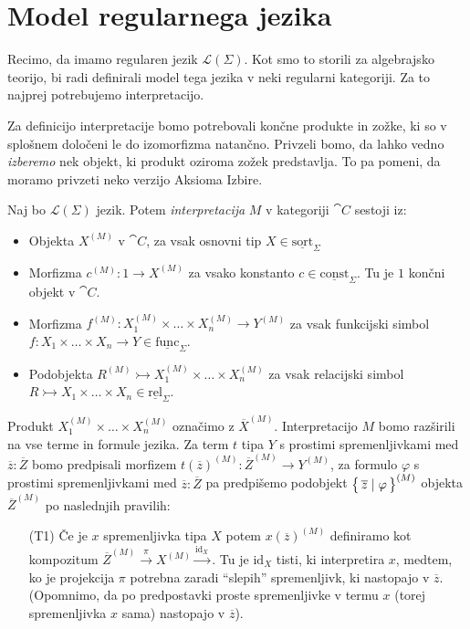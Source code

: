 \documentclass[../kategoricna_logika.tex]{subfiles}
\begin{document}
\section{Model regularnega jezika}
Recimo, da imamo regularen jezik $\mathcal{L}(\Sigma)$. Kot smo to storili za algebrajsko teorijo, bi radi definirali model tega jezika v neki regularni kategoriji.
Za to najprej potrebujemo interpretacijo.
\begin{opomba}
  Za definicijo interpretacije bomo potrebovali končne produkte in zožke, ki so v splošnem določeni le do izomorfizma natančno. Privzeli bomo, da lahko vedno \emph{izberemo} nek objekt, ki produkt oziroma zožek predstavlja. To pa pomeni, da moramo privzeti neko verzijo Aksioma Izbire.
\end{opomba}
\begin{definicija}
  Naj bo $\mathcal{L}(\Sigma)$ jezik. Potem \emph{interpretacija} $M$ v kategoriji $\cat{C}$ sestoji iz:
  \begin{itemize}
    \item Objekta $X^{(M)}$ v $\cat{C}$, za vsak osnovni tip $X \in \underline{\mathrm{sort}}_\Sigma$
    \item Morfizma $c^{(M)} : 1 \to X^{(M)}$ za vsako konstanto $c \in \underline{\mathrm{const}}_\Sigma$. Tu je $1$ končni objekt v $\cat{C}$.
    \item Morfizma $f^{(M)}  : X_1^{(M)} \times \ldots \times X_n^{(M)} \to Y^{(M)}$ za vsak funkcijski simbol $f : X_1 \times \ldots \times X_n \to Y \in \underline{\mathrm{func}}_\Sigma$.
    \item Podobjekta $R^{(M)} \rightarrowtail X_1^{(M)} \times \ldots \times X_n^{(M)}$ za vsak relacijski simbol\\ $R \rightarrowtail X_1 \times \ldots \times X_n \in \underline{\mathrm{rel}}_\Sigma$.
  \end{itemize}
  Produkt $X_1^{(M)} \times \ldots \times X_n^{(M)}$ označimo z $\overline{X}^{(M)}$. 
  Interpretacijo $M$ bomo razširili na vse terme in formule jezika.
  Za term $t$ tipa $Y$ s prostimi spremenljivkami med $\overline{z} : \overline{Z}$ bomo predpisali morfizem $t(\overline{z})^{(M)} : \overline{Z}^{(M)} \to Y^{(M)}$, za formulo $\varphi$ s prostimi spremenljivkami med $\overline{z} : \overline{Z}$ pa predpišemo podobjekt $\left\lbrace\,\overline{z} \mid \varphi\,\right\rbrace^{(M)}$ objekta $\overline{Z}^{(M)}$ po naslednjih pravilih:
  \begin{itemize}
    \item[(T1)] Če je $x$ spremenljivka tipa $X$ potem $x(\overline{z})^{(M)}$ definiramo kot kompozitum $\overline{Z}^{(M)} \xrightarrow{\pi} X^{(M)} \xrightarrow{\mathrm{id}_X}$. Tu je $\mathrm{id}_X$ tisti, ki interpretira $x$, medtem, ko je projekcija $\pi$ potrebna zaradi ``slepih'' spremenljivk, ki nastopajo v $\overline{z}$. (Opomnimo, da po predpostavki proste spremenljivke v termu $x$ (torej spremenljivka $x$ sama) nastopajo v $\overline{z}$).

\end{itemize}
\end{definicija}
\end{document}
